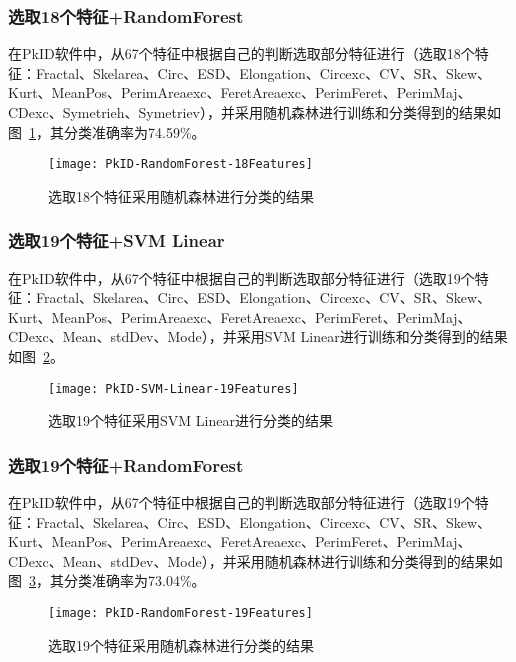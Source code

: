 \subsubsection{选取18个特征+RandomForest}
在PkID软件中，从67个特征中根据自己的判断选取部分特征进行（选取18个特征：Fractal、Skelarea、Circ、ESD、Elongation、Circexc、CV、SR、Skew、Kurt、MeanPos、PerimAreaexc、FeretAreaexc、PerimFeret、PerimMaj、CDexc、Symetrieh、Symetriev），并采用随机森林进行训练和分类得到的结果如图~\ref{fig:PkID-RandomForest-18Features}，其分类准确率为74.59\%。

\begin{figure}[!ht]
\centering
\texttt{[image: PkID-RandomForest-18Features]}
\caption{选取18个特征采用随机森林进行分类的结果}
\label{fig:PkID-RandomForest-18Features}
\end{figure}

\subsubsection{选取19个特征+SVM Linear}
在PkID软件中，从67个特征中根据自己的判断选取部分特征进行（选取19个特征：Fractal、Skelarea、Circ、ESD、Elongation、Circexc、CV、SR、Skew、Kurt、MeanPos、PerimAreaexc、FeretAreaexc、PerimFeret、PerimMaj、CDexc、Mean、stdDev、Mode），并采用SVM Linear进行训练和分类得到的结果如图~\ref{fig:PkID-SVM-Linear-19Features}。

\begin{figure}[!ht]
\centering
\texttt{[image: PkID-SVM-Linear-19Features]}
\caption{选取19个特征采用SVM Linear进行分类的结果}
\label{fig:PkID-SVM-Linear-19Features}
\end{figure}

\subsubsection{选取19个特征+RandomForest}
在PkID软件中，从67个特征中根据自己的判断选取部分特征进行（选取19个特征：Fractal、Skelarea、Circ、ESD、Elongation、Circexc、CV、SR、Skew、Kurt、MeanPos、PerimAreaexc、FeretAreaexc、PerimFeret、PerimMaj、CDexc、Mean、stdDev、Mode），并采用随机森林进行训练和分类得到的结果如图~\ref{fig:PkID-RandomForest-19Features}，其分类准确率为73.04\%。

\begin{figure}[!ht]
\centering
\texttt{[image: PkID-RandomForest-19Features]}
\caption{选取19个特征采用随机森林进行分类的结果}
\label{fig:PkID-RandomForest-19Features}
\end{figure}

